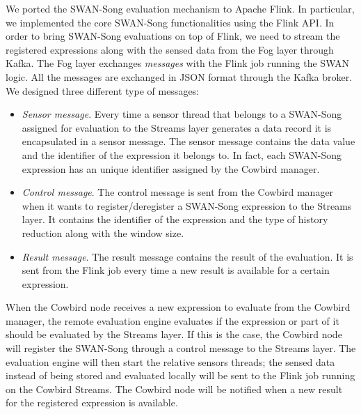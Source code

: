 We ported the SWAN-Song evaluation mechanism to Apache Flink. In particular, we implemented the core SWAN-Song functionalities using the Flink API. In order to bring SWAN-Song evaluations on top of Flink, we need to stream the registered expressions along with the sensed data from the Fog layer through Kafka. The Fog layer exchanges \emph{messages} with the Flink job running the SWAN logic. All the messages are exchanged in JSON format through the Kafka broker. We designed three different type of messages:
\begin{itemize}
\item \emph{Sensor message}. Every time a sensor thread that belongs to a SWAN-Song assigned for evaluation to the Streams layer generates a data record it is encapsulated in a sensor message. The sensor message contains the data value and the identifier of the expression it belongs to. In fact, each SWAN-Song expression has an unique identifier assigned by the Cowbird manager.
\item \emph{Control message}. The control message is sent from the Cowbird manager when it wants to register/deregister a SWAN-Song expression to the Streams layer. It contains the identifier of the expression and the type of history reduction along with the window size.
\item	 \emph{Result message}. The result message contains the result of the evaluation. It is sent from the Flink job every time a new result is available for a certain expression.  
\end{itemize}

When the Cowbird node receives a new expression to evaluate from the Cowbird manager, the remote evaluation engine evaluates if the expression or part of it should be evaluated by the Streams layer. If this is the case, the Cowbird node will register the SWAN-Song through a control message to the Streams layer. The evaluation engine will then start the relative sensors threads; the sensed data instead of being stored and evaluated locally will be sent to the Flink job running on the Cowbird Streams. The Cowbird node will be notified when a new result for the registered expression is available.
